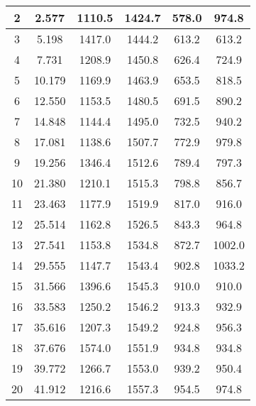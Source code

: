 \begin{enumerate}
\begin{longtable}{|c|c|c|c|c|c|}
			2 & 
			2.577 & 
			1110.5 & 
			1424.7 &
			578.0 & 
			974.8  
			\\\hline
		
			3 & 
			5.198 & 
			1417.0 & 
			1444.2 &
			613.2 & 
			613.2  
			\\\hline
		
			4 & 
			7.731 & 
			1208.9 & 
			1450.8 &
			626.4 & 
			724.9  
			\\\hline
		
			5 & 
			10.179 & 
			1169.9 & 
			1463.9 &
			653.5 & 
			818.5  
			\\\hline
		
			6 & 
			12.550 & 
			1153.5 & 
			1480.5 &
			691.5 & 
			890.2  
			\\\hline
		
			7 & 
			14.848 & 
			1144.4 & 
			1495.0 &
			732.5 & 
			940.2  
			\\\hline
		
			8 & 
			17.081 & 
			1138.6 & 
			1507.7 &
			772.9 & 
			979.8  
			\\\hline
		
			9 & 
			19.256 & 
			1346.4 & 
			1512.6 &
			789.4 & 
			797.3  
			\\\hline
		
			10 & 
			21.380 & 
			1210.1 & 
			1515.3 &
			798.8 & 
			856.7  
			\\\hline
		
			11 & 
			23.463 & 
			1177.9 & 
			1519.9 &
			817.0 & 
			916.0  
			\\\hline
		
			12 & 
			25.514 & 
			1162.8 & 
			1526.5 &
			843.3 & 
			964.8  
			\\\hline
		
			13 & 
			27.541 & 
			1153.8 & 
			1534.8 &
			872.7 & 
			1002.0  
			\\\hline
		
			14 & 
			29.555 & 
			1147.7 & 
			1543.4 &
			902.8 & 
			1033.2  
			\\\hline
		
			15 & 
			31.566 & 
			1396.6 & 
			1545.3 &
			910.0 & 
			910.0  
			\\\hline
		
			16 & 
			33.583 & 
			1250.2 & 
			1546.2 &
			913.3 & 
			932.9  
			\\\hline
		
			17 & 
			35.616 & 
			1207.3 & 
			1549.2 &
			924.8 & 
			956.3  
			\\\hline
		
			18 & 
			37.676 & 
			1574.0 & 
			1551.9 &
			934.8 & 
			934.8  
			\\\hline
		
			19 & 
			39.772 & 
			1266.7 & 
			1553.0 &
			939.2 & 
			950.4  
			\\\hline
		
			20 & 
			41.912 & 
			1216.6 & 
			1557.3 &
			954.5 & 
			974.8  
			\\\hline
			
		\end{longtable}

\end{enumerate}

